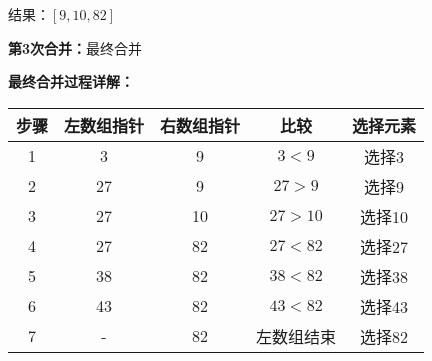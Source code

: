 \documentclass[12pt,a4paper]{amsart}
\begin{document}
结果：$[9, 10, 82]$

\textbf{第3次合并：}最终合并

\begin{center}
\end{center}

\textbf{最终合并过程详解：}

\begin{center}
\begin{tabular}{|c|c|c|c|c|}
\hline
\textbf{步骤} & \textbf{左数组指针} & \textbf{右数组指针} & \textbf{比较} & \textbf{选择元素} \\
\hline
1 & 3 & 9 & $3 < 9$ & 选择3 \\
\hline
2 & 27 & 9 & $27 > 9$ & 选择9 \\
\hline
3 & 27 & 10 & $27 > 10$ & 选择10 \\
\hline
4 & 27 & 82 & $27 < 82$ & 选择27 \\
\hline
5 & 38 & 82 & $38 < 82$ & 选择38 \\
\hline
6 & 43 & 82 & $43 < 82$ & 选择43 \\
\hline
7 & - & 82 & 左数组结束 & 选择82 \\
\hline
\end{tabular}
\end{center}
\end{document}
